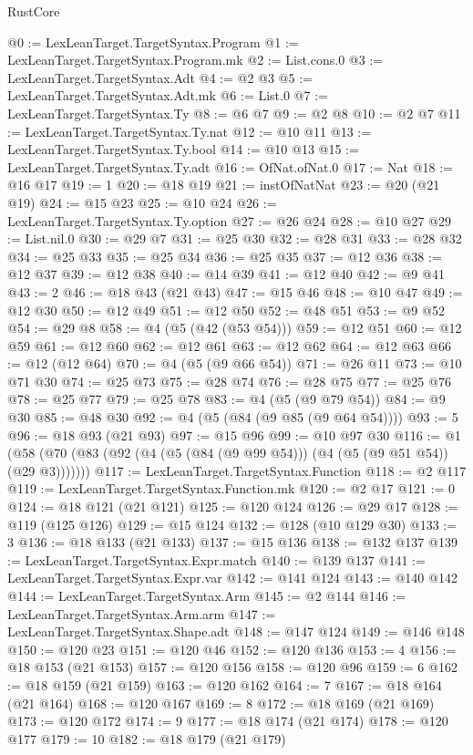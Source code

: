 \begin{lexlean}{RustCore}
\begin{coremodule}
@0 := LexLeanTarget.TargetSyntax.Program
@1 := LexLeanTarget.TargetSyntax.Program.mk
@2 := List.cons.{0}
@3 := LexLeanTarget.TargetSyntax.Adt
@4 := @2 @3
@5 := LexLeanTarget.TargetSyntax.Adt.mk
@6 := List.{0}
@7 := LexLeanTarget.TargetSyntax.Ty
@8 := @6 @7
@9 := @2 @8
@10 := @2 @7
@11 := LexLeanTarget.TargetSyntax.Ty.nat
@12 := @10 @11
@13 := LexLeanTarget.TargetSyntax.Ty.bool
@14 := @10 @13
@15 := LexLeanTarget.TargetSyntax.Ty.adt
@16 := OfNat.ofNat.{0}
@17 := Nat
@18 := @16 @17
@19 := 1
@20 := @18 @19
@21 := instOfNatNat
@23 := @20 (@21 @19)
@24 := @15 @23
@25 := @10 @24
@26 := LexLeanTarget.TargetSyntax.Ty.option
@27 := @26 @24
@28 := @10 @27
@29 := List.nil.{0}
@30 := @29 @7
@31 := @25 @30
@32 := @28 @31
@33 := @28 @32
@34 := @25 @33
@35 := @25 @34
@36 := @25 @35
@37 := @12 @36
@38 := @12 @37
@39 := @12 @38
@40 := @14 @39
@41 := @12 @40
@42 := @9 @41
@43 := 2
@46 := @18 @43 (@21 @43)
@47 := @15 @46
@48 := @10 @47
@49 := @12 @30
@50 := @12 @49
@51 := @12 @50
@52 := @48 @51
@53 := @9 @52
@54 := @29 @8
@58 := @4 (@5 (@42 (@53 @54)))
@59 := @12 @51
@60 := @12 @59
@61 := @12 @60
@62 := @12 @61
@63 := @12 @62
@64 := @12 @63
@66 := @12 (@12 @64)
@70 := @4 (@5 (@9 @66 @54))
@71 := @26 @11
@73 := @10 @71 @30
@74 := @25 @73
@75 := @28 @74
@76 := @28 @75
@77 := @25 @76
@78 := @25 @77
@79 := @25 @78
@83 := @4 (@5 (@9 @79 @54))
@84 := @9 @30
@85 := @48 @30
@92 := @4 (@5 (@84 (@9 @85 (@9 @64 @54))))
@93 := 5
@96 := @18 @93 (@21 @93)
@97 := @15 @96
@99 := @10 @97 @30
@116 := @1 (@58 (@70 (@83 (@92 (@4 (@5 (@84 (@9 @99 @54))) (@4 (@5 (@9 @51 @54)) (@29 @3)))))))
@117 := LexLeanTarget.TargetSyntax.Function
@118 := @2 @117
@119 := LexLeanTarget.TargetSyntax.Function.mk
@120 := @2 @17
@121 := 0
@124 := @18 @121 (@21 @121)
@125 := @120 @124
@126 := @29 @17
@128 := @119 (@125 @126)
@129 := @15 @124
@132 := @128 (@10 @129 @30)
@133 := 3
@136 := @18 @133 (@21 @133)
@137 := @15 @136
@138 := @132 @137
@139 := LexLeanTarget.TargetSyntax.Expr.match
@140 := @139 @137
@141 := LexLeanTarget.TargetSyntax.Expr.var
@142 := @141 @124
@143 := @140 @142
@144 := LexLeanTarget.TargetSyntax.Arm
@145 := @2 @144
@146 := LexLeanTarget.TargetSyntax.Arm.arm
@147 := LexLeanTarget.TargetSyntax.Shape.adt
@148 := @147 @124
@149 := @146 @148
@150 := @120 @23
@151 := @120 @46
@152 := @120 @136
@153 := 4
@156 := @18 @153 (@21 @153)
@157 := @120 @156
@158 := @120 @96
@159 := 6
@162 := @18 @159 (@21 @159)
@163 := @120 @162
@164 := 7
@167 := @18 @164 (@21 @164)
@168 := @120 @167
@169 := 8
@172 := @18 @169 (@21 @169)
@173 := @120 @172
@174 := 9
@177 := @18 @174 (@21 @174)
@178 := @120 @177
@179 := 10
@182 := @18 @179 (@21 @179)

\end{coremodule}
\end{lexlean}
